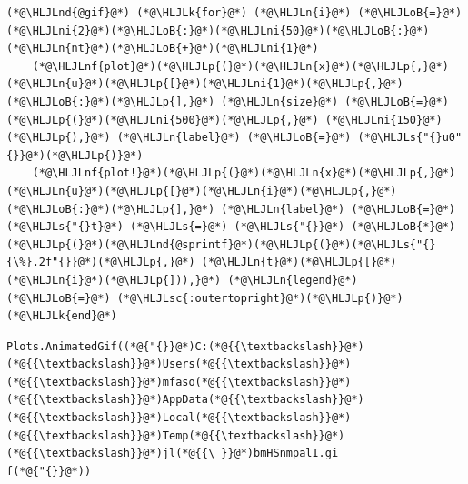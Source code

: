 \documentclass[12pt,a4paper]{article}
\newcommand{\HLJLk}[1]{\textcolor[RGB]{148,91,176}{\textbf{#1}}}
\newcommand{\HLJLn}[1]{#1}
\newcommand{\HLJLnd}[1]{\textcolor[RGB]{214,102,97}{#1}}
\newcommand{\HLJLnf}[1]{\textcolor[RGB]{66,102,213}{#1}}
\newcommand{\HLJLs}[1]{\textcolor[RGB]{201,61,57}{#1}}
\newcommand{\HLJLsc}[1]{\textcolor[RGB]{201,61,57}{#1}}
\newcommand{\HLJLni}[1]{\textcolor[RGB]{59,151,46}{#1}}
\newcommand{\HLJLoB}[1]{\textcolor[RGB]{102,102,102}{\textbf{#1}}}
\newcommand{\HLJLp}[1]{#1}
\begin{document}
\begin{lstlisting}
(*@\HLJLnd{@gif}@*) (*@\HLJLk{for}@*) (*@\HLJLn{i}@*) (*@\HLJLoB{=}@*) (*@\HLJLni{2}@*)(*@\HLJLoB{:}@*)(*@\HLJLni{50}@*)(*@\HLJLoB{:}@*)(*@\HLJLn{nt}@*)(*@\HLJLoB{+}@*)(*@\HLJLni{1}@*) 
    (*@\HLJLnf{plot}@*)(*@\HLJLp{(}@*)(*@\HLJLn{x}@*)(*@\HLJLp{,}@*) (*@\HLJLn{u}@*)(*@\HLJLp{[}@*)(*@\HLJLni{1}@*)(*@\HLJLp{,}@*)(*@\HLJLoB{:}@*)(*@\HLJLp{],}@*) (*@\HLJLn{size}@*) (*@\HLJLoB{=}@*) (*@\HLJLp{(}@*)(*@\HLJLni{500}@*)(*@\HLJLp{,}@*) (*@\HLJLni{150}@*)(*@\HLJLp{),}@*) (*@\HLJLn{label}@*) (*@\HLJLoB{=}@*) (*@\HLJLs{"{}u0"{}}@*)(*@\HLJLp{)}@*)
    (*@\HLJLnf{plot!}@*)(*@\HLJLp{(}@*)(*@\HLJLn{x}@*)(*@\HLJLp{,}@*) (*@\HLJLn{u}@*)(*@\HLJLp{[}@*)(*@\HLJLn{i}@*)(*@\HLJLp{,}@*)(*@\HLJLoB{:}@*)(*@\HLJLp{],}@*) (*@\HLJLn{label}@*) (*@\HLJLoB{=}@*) (*@\HLJLs{"{}t}@*) (*@\HLJLs{=}@*) (*@\HLJLs{"{}}@*) (*@\HLJLoB{*}@*) (*@\HLJLp{(}@*)(*@\HLJLnd{@sprintf}@*)(*@\HLJLp{(}@*)(*@\HLJLs{"{}{\%}.2f"{}}@*)(*@\HLJLp{,}@*) (*@\HLJLn{t}@*)(*@\HLJLp{[}@*)(*@\HLJLn{i}@*)(*@\HLJLp{])),}@*) (*@\HLJLn{legend}@*) (*@\HLJLoB{=}@*) (*@\HLJLsc{:outertopright}@*)(*@\HLJLp{)}@*)
(*@\HLJLk{end}@*)
\end{lstlisting}

\begin{lstlisting}
Plots.AnimatedGif((*@{"{}}@*)C:(*@{{\textbackslash}}@*)(*@{{\textbackslash}}@*)Users(*@{{\textbackslash}}@*)(*@{{\textbackslash}}@*)mfaso(*@{{\textbackslash}}@*)(*@{{\textbackslash}}@*)AppData(*@{{\textbackslash}}@*)(*@{{\textbackslash}}@*)Local(*@{{\textbackslash}}@*)(*@{{\textbackslash}}@*)Temp(*@{{\textbackslash}}@*)(*@{{\textbackslash}}@*)jl(*@{{\_}}@*)bmHSnmpalI.gi
f(*@{"{}}@*))
\end{lstlisting}
\end{document}
